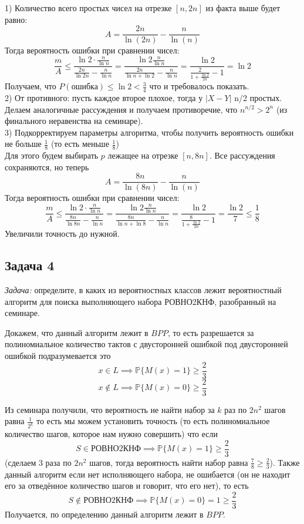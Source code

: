 \documentclass[a4paper,12pt]{article} %
\begin{document}
1) Количество всего простых чисел на отрезке $[n, 2n]$ из факта выше будет равно: 
$$
A = \frac{2n}{\ln(2n)} - \frac{n}{\ln(n)}
$$
Тогда вероятность ошибки при сравнении чисел:
$$
\frac{m}{A} \leq \frac{\ln 2 \cdot \frac{n}{\ln n}}{\frac{2 n}{\ln 2 n}-\frac{n}{\ln n}}=\frac{\ln 2 \frac{n}{\ln n}}{\frac{2 n}{\ln n+\ln 2}-\frac{n}{\ln n}}=\frac{\ln 2}{\frac{2}{1+\frac{\ln 2}{2 n}}-1}=\ln 2
$$
Получаем, что $ P(\text{ошибка}) \leq \ln 2 < \frac{3}{4} $ что и требовалось показать. \\

2) От противного: пусть каждое второе плохое, тогда у $ |X-Y| $ n/2 простых. Делаем аналогичные рассуждения и получаем противоречие, что $ n^{n/2}>2^{n} $ (из финального неравенства на семинаре).\\
 
3) Подкорректируем параметры алгоритма, чтобы получить вероятность ошибки не больше $\frac{1}{8}$ (то есть меньше $\frac{1}{8}$)\\
Для этого будем выбирать $ p $ лежащее на отрезке $[n, 8n]$. Все рассуждения сохраняются, но теперь 
$$
A = \frac{8n}{\ln(8n)} - \frac{n}{\ln(n)}
$$
Тогда вероятность ошибки при сравнении чисел:
$$
\frac{m}{A} \leq \frac{\ln 2 \cdot \frac{n}{\ln n}}{\frac{8 n}{\ln 8 n}-\frac{n}{\ln n}}=\frac{\ln 2 \frac{n}{\ln n}}{\frac{8 n}{\ln n+\ln 8}-\frac{n}{\ln n}}=\frac{\ln 2}{\frac{8}{1+\frac{\ln 2}{2 n}}-1}= \frac{\ln 2}{7} \leqslant \frac{1}{8}
$$
Увеличили точность до нужной.


\subsection*{Задача 4}
\textit{Задача:} определите, в каких из вероятностных классов лежит вероятностный алгоритм для поиска выполняющего набора РОВНО2КНФ, разобранный на семинаре. \\ \smallskip

Докажем, что данный алгоритм лежит в $ BPP $, то есть разрешается за полиномиальное количество тактов с двусторонней ошибкой под двусторонней ошибкой подразумевается это
\[
x \in L \implies \mathbb{P}\{M(x)=1\} \geqslant \dfrac{2}{3}
\]
\[
x \not\in L \implies \mathbb{P}\{M(x)=0\} \geqslant \dfrac{2}{3}
\]

Из семинара получили, что вероятность не найти набор за $ k $ раз по $ 2n^2 $ шагов равна $ \frac{1}{2^k} $ то есть мы можем установить точность (то есть полиномиальное количество шагов, которое нам нужно совершить) что если 
\[
S \in \text{РОВНО2КНФ} \implies \mathbb{P}\{M(x)=1\} \geqslant \dfrac{2}{3}
\]
(сделаем 3 раза по $ 2n^2 $ шагов, тогда вероятность найти набор равна $ \frac{7}{8} \geqslant \frac{2}{3} $). Также данный алгоритм если нет исполняющего набора, не ошибается (он не находит его за отведённое количество шагов и говорит, что его нет), то есть 
\[
S \not\in \text{РОВНО2КНФ} \implies \mathbb{P}\{M(x)=0\} = 1 \geqslant \frac{2}{3}
\]
Получается, по определению данный алгоритм лежит в $ BPP $.\\
\end{document}
